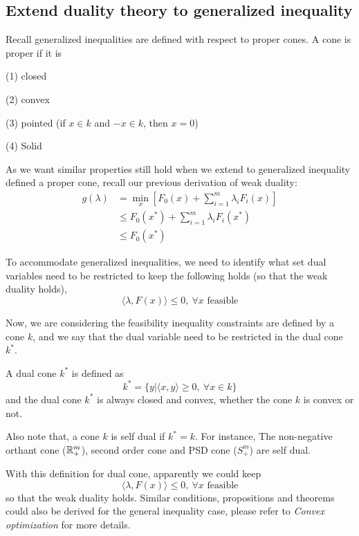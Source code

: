 \subsection{Extend duality theory to generalized inequality}
Recall generalized inequalities are defined with respect to proper cones. A cone is proper if it is

	(1) closed
	
	(2) convex
	
	(3) pointed (if $x\in k$ and $-x\in k$, then $x=0$)
	
	(4) Solid


\vspace{0.3cm}
As we want similar properties still hold when we extend to generalized inequality defined a proper cone, recall our previous derivation of weak duality:
\begin{align*}
g(\lambda) &= \min_x[F_0(x) + \sum^m_{i=1}\lambda_iF_i(x)]\\
&\leq F_0(x^*) + \sum^m_{i=1}\lambda_i F_i(x^*) \\
&\leq F_0(x^*)
\end{align*}

To accommodate generalized inequalities, we need to identify what set dual variables need to be restricted to keep the following holds (so that the weak duality holds),
\begin{equation*}
\langle \lambda, F(x)\rangle\leq 0,\ \forall x \text{ feasible}
\end{equation*}

Now, we are considering the feasibility inequality constraints are defined by a cone $k$, and we say that the dual variable need to be restricted in the dual cone $k^*$.
	
A dual cone $k^*$ is defined as 
$$k^*=\{y| \langle x,y\rangle \geq 0,\ \forall x\in k \}$$
and the dual cone $k^*$ is always closed and convex, whether the cone $k$ is convex or not.

Also note that, a cone $k$ is self dual if $k^*=k$. For instance, The non-negative orthant cone ($\mathbb{R}_+^m$), second order cone and PSD cone ($S^m_+$) are self dual.

With this definition for dual cone, apparently we could keep 
\begin{equation*}
\langle \lambda, F(x)\rangle\leq 0,\ \forall x \text{ feasible}
\end{equation*}
so that the weak duality holds. Similar conditions, propositions and theorems could also be derived for the general inequality case, please refer to \textit{Convex optimization} for more details.


